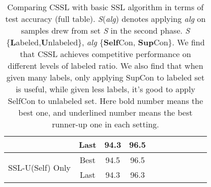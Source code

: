 \documentclass[letterpaper]{article} \usepackage{aaai22}  \usepackage{times}  \usepackage{helvet}  \usepackage{courier}  \usepackage[hyphens]{url}  \usepackage{graphicx} \usepackage{subfigure}
\begin{document}
\begin{table}[h]
\begin{center}
\begin{tabular}{lcccccccccc}
& Last & 94.3 & 96.5 \\
\hline
\multirow{2}{*}{SSL-U(Self) Only} & Best & 94.5 & 96.5 \\
& Last & 94.3 & 96.3 \\
\hline
\end{tabular}
\end{center}
\caption{Comparing CSSL with basic SSL algorithm in terms of test accuracy (full table). \textit{S}(\textit{alg}) denotes applying \textit{alg} on samples drew from set \textit{S} in the second phase. \textit{S} \{\textbf{L}abeled,\textbf{U}nlabeled\}, \textit{alg}  \{\textbf{Self}Con, \textbf{Sup}Con\}. We find that CSSL achieves competitive performance on different levels of labeled ratio. We also find that when given many labels, only applying SupCon to labeled set is useful, while given less labels, it's good to apply SelfCon to unlabeled set. Here bold number means the best one, and underlined number means the best runner-up one in each setting. }
\label{tab:table1_complete}
\end{table}
\end{document}
